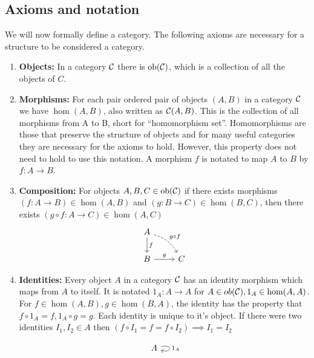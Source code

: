 \documentclass[10pt,a4paper,reqno]{amsart}
\numberwithin{figure}{section}
\begin{document}
\subsection{Axioms and notation}
We will now formally define a category. The following axioms are necessary for a
structure to be considered a category.
\begin{enumerate}
        \item \textbf{Objects:} In a category $\mathcal{C}$ there is
        $\operatorname{ob}(\mathcal{C})$, which is a collection of all the objects of $C$.

        \item \textbf{Morphisms:} For each pair ordered pair of objects $(A,B)$
        in a category $\mathcal{C}$ we have $\hom(A,B)$, also written as
        $\mathcal{C}(A,B)$.  This is the collection of all morphisms from A to B,
        short for ``homomorphism set''. Homomorphisms are those that preserve
        the structure of objects and for many useful categories they are
        necessary for the axioms to hold. However, this property does not need
        to hold to use this notation.  A morphism $f$ is notated to map $A$ to
        $B$ by $f: A\to B$.

        \item \textbf{Composition:} For objects $A,B,C\in \operatorname{ob}(\mathcal{C})$
        if there exists morphisms $(f: A\to B)\in \hom(A,B)$ and $(g: B\to C)\in
        \hom(B,C)$, then there exists $(g\circ f: A\to C)\in \hom(A,C)$
        \begin{equation}
        \begin{tikzcd}
                A \ar[dr,"g\circ f",bend left=20, dashrightarrow] \ar[d,"f"] \\
                B \ar[r,"g"] & C
        \end{tikzcd}
        \end{equation}
        \item \textbf{Identities:} Every object $A$ in a category $\mathcal{C}$
        has an identity morphism which maps from $A$ to itself.  It is notated
        $1_A: A\to A$ for $A\in ob(\mathcal{C}), 1_A\in \hom(A,A)$.  For $f\in
        \hom(A,B), g\in \hom(B,A)$, the identity has the property that $f\circ
        1_A = f, 1_A\circ g = g$. Each identity is unique to it's object. If
        there were two identities $I_1,I_2\in A$ then $(f\circ I_1 = f = f\circ
        I_2) \implies I_1=I_2$

        \begin{equation}
        \begin{tikzcd}
                A \ar[loop right,"1_A"]
        \end{tikzcd}
        \end{equation}


\end{enumerate}
\end{document}
